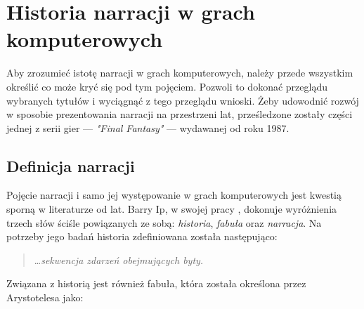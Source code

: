 \graphicspath{{chapters/chapter1/imgs/}}

\chapter{Historia narracji w grach komputerowych}\label{chapter:ch1}



Aby zrozumieć istotę narracji w grach komputerowych, należy przede wszystkim określić
co może kryć się pod tym pojęciem. Pozwoli to dokonać przeglądu wybranych tytułów
i wyciągnąć z tego przeglądu wnioski. Żeby udowodnić rozwój w sposobie prezentowania narracji
na przestrzeni lat, prześledzone zostały części jednej z serii gier --- \textit{"Final Fantasy"} ---
wydawanej od roku 1987.

\section{Definicja narracji}\label{subsection:ch1_1}

Pojęcie narracji i samo jej występowanie w grach komputerowych jest kwestią sporną
w literaturze od lat. Barry Ip, w swojej pracy \cite{narrative_structures}, dokonuje wyróżnienia trzech słów ściśle
powiązanych ze sobą: \textit{historia}, \textit{fabuła} oraz \textit{narracja}. Na potrzeby jego
badań historia zdefiniowana została następująco:

\begin{quotation}
	\ldots \textit{sekwencja zdarzeń obejmujących byty.} \cite{narrative_structures}
\end{quotation}

Związana z historią jest również fabuła, która została określona przez Arystotelesa jako:

